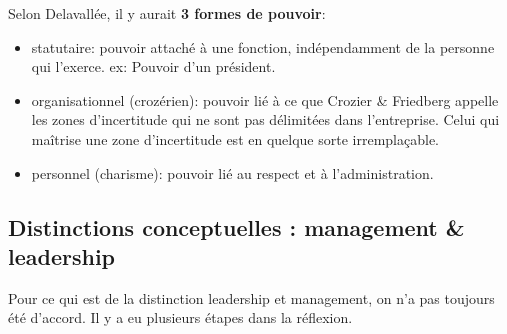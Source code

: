 \documentclass[12pt]{article}
\begin{document}
	Selon Delavallée, il y aurait \textbf{3 formes de pouvoir}:
	\begin{itemize}
	\item statutaire: pouvoir attaché à une fonction, indépendamment de la personne qui l'exerce. \newline
	ex: Pouvoir d'un président.
	\item organisationnel (crozérien): pouvoir lié à ce que Crozier \& Friedberg appelle les zones d'incertitude qui ne sont pas délimitées dans l'entreprise. Celui qui maîtrise une zone d'incertitude est en quelque sorte irremplaçable.
	\item personnel (charisme): pouvoir lié au respect et à l'administration.
	\end{itemize}
	
	
	\subsection{Distinctions conceptuelles : management \& leadership}
	
	Pour ce qui est de la distinction leadership et management, on n'a pas toujours été d'accord. Il y a eu plusieurs étapes dans la réflexion.\newline
	
\end{document}
